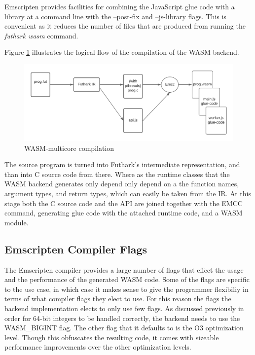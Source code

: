 \documentclass[11pt]{book}
\begin{document}

Emscripten provides facilities for combining the JavaScript glue code with a library at a command line with the --post-fix and --js-library flags. This is convenient as it reduces the number of files that are produced from running the \textit{futhark wasm} command.



Figure \ref{fig:wasm} illustrates the logical flow of the compilation of the WASM backend. 

\begin{figure}[htbp]
\centerline{\includegraphics[width=\textwidth]{figures/WASM_MC_compiler.png}}
\caption{WASM-multicore compilation}
\label{fig:wasm}
\end{figure}

The source program is turned into Futhark's intermediate representation, and than into C source code from there. Where as the runtime classes that the WASM backend generates only depend only depend on a the function names, argument types, and return types, which can easily be taken from the IR. At this stage both the C source code and the API are joined together with the EMCC command, generating glue code with the attached runtime code, and a WASM module. 

\subsection{Emscripten Compiler Flags}
The Emscripten compiler provides a large number of flags that effect the usage and the performance of the generated WASM code. Some of the flags are specific to the use case, in which case it makes sense to give the programmer flexibiliy in terms of what compiler flags they elect to use. For this reason the flags the backend implementation elects to only use few flags. As discussed previously in order for 64-bit integers to be handled correctly, the backend needs to use the WASM\_BIGINT flag. The other flag that it defaults to is the O3 optimization level. Though this obfuscates the resulting code, it comes with sizeable performance improvements over the other optimization levels.
\end{document}
